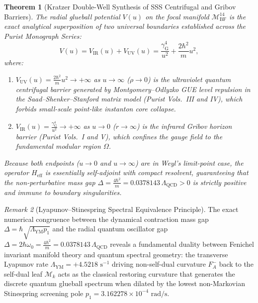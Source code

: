 \documentclass[11pt,a4paper,reqno]{article}
\theoremstyle{plain}
\newtheorem{theorem}{Theorem}[section]
\theoremstyle{definition}
\theoremstyle{remark}
\newtheorem{remark}[theorem]{Remark}
\numberwithin{equation}{section}
\newcommand{\Mbf}{\mathcal{M}_{\mathrm{BF}}^{14}}
\begin{document}
\begin{theorem}[Kratzer Double-Well Synthesis of SSS Centrifugal and Gribov Barriers]
\label{thm:kratzer_double_well_synthesis}
The radial glueball potential $V(u)$ on the focal manifold $\Mbf$ is the exact analytical superposition of two universal boundaries established across the Purist Monograph Series:
\begin{equation}
  V(u) = V_{\mathrm{IR}}(u) + V_{\mathrm{UV}}(u) = \frac{\gamma_{\mathrm{G}}^4}{u^2} + \frac{2\hbar^2}{m} u^2,
\end{equation}
where:
\begin{enumerate}[label=\textbf{(\alph*)}, leftmargin=2.0em]
  \item $V_{\mathrm{UV}}(u) = \frac{2\hbar^2}{m} u^2 \to +\infty$ as $u \to \infty$ ($\rho \to 0$) is the ultraviolet quantum centrifugal barrier generated by Montgomery--Odlyzko GUE level repulsion in the Saad--Shenker--Stanford matrix model (Purist Vols.~III and IV), which forbids small-scale point-like instanton core collapse.
  \item $V_{\mathrm{IR}}(u) = \frac{\gamma_{\mathrm{G}}^4}{u^2} \to +\infty$ as $u \to 0$ ($r \to \infty$) is the infrared Gribov horizon barrier (Purist Vols.~I and V), which confines the gauge field to the fundamental modular region $\Omega$.
\end{enumerate}
Because both endpoints ($u \to 0$ and $u \to \infty$) are in Weyl's limit-point case, the operator $H_{\mathrm{eff}}$ is essentially self-adjoint with compact resolvent, guaranteeing that the non-perturbative mass gap $\Delta = \frac{4\hbar^2}{m} = 0.0378143\,\Lambda_{\mathrm{QCD}} > 0$ is strictly positive and immune to boundary singularities.
\end{theorem}

\begin{remark}[Lyapunov--Stinespring Spectral Equivalence Principle]
\label{rem:lyapunov_stinespring_equiv}
The exact numerical congruence between the dynamical contraction mass gap $\Delta = \hbar\sqrt{\Lambda_{\mathrm{YM}} p_1}$ and the radial quantum oscillator gap $\Delta = 2\hbar\omega_0 = \frac{4\hbar^2}{m} = 0.0378143\,\Lambda_{\mathrm{QCD}}$ reveals a fundamental duality between Fenichel invariant manifold theory and quantum spectral geometry: the transverse Lyapunov rate $\Lambda_{\mathrm{YM}} = +4.5218\text{ s}^{-1}$ driving non-self-dual curvature $F_A^-$ back to the self-dual leaf $\mathcal{M}_k$ acts as the classical restoring curvature that generates the discrete quantum glueball spectrum when dilated by the lowest non-Markovian Stinespring screening pole $p_1 = 3.162278 \times 10^{-4}\text{ rad/s}$.
\end{remark}
\end{document}
